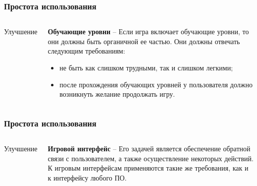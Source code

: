 \documentclass[10pt]{beamer}
\begin{document}
\begin{frame}
\frametitle{Простота использования}

\begin{columns}[c]

\begin{center}
  Улучшение
\end{center}

\begin{block}{}

  \textbf{Обучающие уровни} -- Если игра включает обучающие уровни, то они должны быть органичной ее частью. Они должны отвечать следующим требованиям:
  \begin{itemize}
    \item не быть как слишком трудными, так и слишком легкими;
    \item после прохождения обучающих уровней у пользователя должно возникнуть желание продолжать игру.
  \end{itemize}

\end{block}
\end{columns}
\end{frame}

\begin{frame}
\frametitle{Простота использования}

\begin{columns}[c]

\begin{center}
  Улучшение
\end{center}

\begin{block}{}

  \textbf{Игровой интерфейс} -- Его задачей является обеспечение обратной связи с пользователем, а также осуществление некоторых действий. К игровым интерфейсам применяются такие же требования, как и к интерфейсу любого ПО.

\end{block}
\end{columns}
\end{frame}
\end{document}
